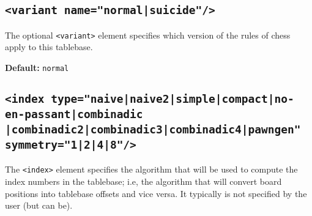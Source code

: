 \documentclass[11pt]{article}
\begin{document}
\subsection{\tt <variant name="normal|suicide"/>}

The optional {\tt <variant>} element specifies which version
of the rules of chess apply to this tablebase.

{\bf Default:} {\tt normal}


\subsection{\tt <index type="naive|naive2|simple|compact|no-en-passant|combinadic \hfil\break\hbox{\qquad\qquad\qquad\qquad} |combinadic2|combinadic3|combinadic4|pawngen" \hfil\break\hbox{\qquad} symmetry="1|2|4|8"/>}

The {\tt <index>} element specifies the algorithm that will be used to
compute the index numbers in the tablebase; i.e, the algorithm that
will convert board positions into tablebase offsets and vice versa.
It typically is not specified by the user (but can be).
\end{document}
